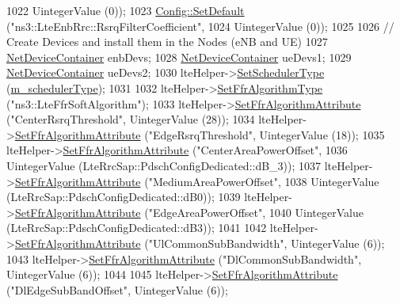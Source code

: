 \begin{DoxyCode}
1022                       UintegerValue (0));
1023   \hyperlink{group__config_ga2e7882df849d8ba4aaad31c934c40c06}{Config::SetDefault} (\textcolor{stringliteral}{"ns3::LteEnbRrc::RsrqFilterCoefficient"},
1024                       UintegerValue (0));
1025 
1026   \textcolor{comment}{// Create Devices and install them in the Nodes (eNB and UE)}
1027   \hyperlink{classns3_1_1NetDeviceContainer}{NetDeviceContainer} enbDevs;
1028   \hyperlink{classns3_1_1NetDeviceContainer}{NetDeviceContainer} ueDevs1;
1029   \hyperlink{classns3_1_1NetDeviceContainer}{NetDeviceContainer} ueDevs2;
1030   lteHelper->\hyperlink{classns3_1_1LteHelper_a8f86e55b8b80a81732c4b2df00fb25d5}{SetSchedulerType} (\hyperlink{classLteFrAreaTestCase_aa093fda7c4b63732d547c87952f52f05}{m\_schedulerType});
1031 
1032   lteHelper->\hyperlink{classns3_1_1LteHelper_a035c6b03305c1511975362f80425b5fc}{SetFfrAlgorithmType} (\textcolor{stringliteral}{"ns3::LteFfrSoftAlgorithm"});
1033   lteHelper->\hyperlink{classns3_1_1LteHelper_a793d56e843a844428851e90752c5f130}{SetFfrAlgorithmAttribute} (\textcolor{stringliteral}{"CenterRsrqThreshold"}, UintegerValue (28));
1034   lteHelper->\hyperlink{classns3_1_1LteHelper_a793d56e843a844428851e90752c5f130}{SetFfrAlgorithmAttribute} (\textcolor{stringliteral}{"EdgeRsrqThreshold"}, UintegerValue (18));
1035   lteHelper->\hyperlink{classns3_1_1LteHelper_a793d56e843a844428851e90752c5f130}{SetFfrAlgorithmAttribute} (\textcolor{stringliteral}{"CenterAreaPowerOffset"},
1036                                        UintegerValue (LteRrcSap::PdschConfigDedicated::dB\_3));
1037   lteHelper->\hyperlink{classns3_1_1LteHelper_a793d56e843a844428851e90752c5f130}{SetFfrAlgorithmAttribute} (\textcolor{stringliteral}{"MediumAreaPowerOffset"},
1038                                        UintegerValue (LteRrcSap::PdschConfigDedicated::dB0));
1039   lteHelper->\hyperlink{classns3_1_1LteHelper_a793d56e843a844428851e90752c5f130}{SetFfrAlgorithmAttribute} (\textcolor{stringliteral}{"EdgeAreaPowerOffset"},
1040                                        UintegerValue (LteRrcSap::PdschConfigDedicated::dB3));
1041 
1042   lteHelper->\hyperlink{classns3_1_1LteHelper_a793d56e843a844428851e90752c5f130}{SetFfrAlgorithmAttribute} (\textcolor{stringliteral}{"UlCommonSubBandwidth"}, UintegerValue (6));
1043   lteHelper->\hyperlink{classns3_1_1LteHelper_a793d56e843a844428851e90752c5f130}{SetFfrAlgorithmAttribute} (\textcolor{stringliteral}{"DlCommonSubBandwidth"}, UintegerValue (6));
1044 
1045   lteHelper->\hyperlink{classns3_1_1LteHelper_a793d56e843a844428851e90752c5f130}{SetFfrAlgorithmAttribute} (\textcolor{stringliteral}{"DlEdgeSubBandOffset"}, UintegerValue (6));

\end{DoxyCode}
